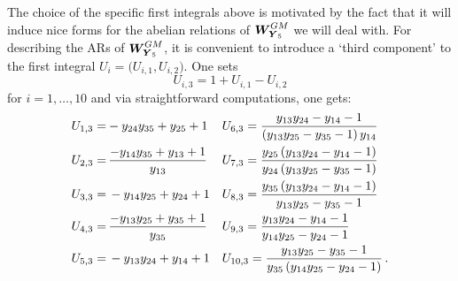 \documentclass[11pt]{amsart}
\newcommand{\sk}{\smallskip}
\begin{document}


The choice of the specific first integrals above is motivated by the fact that it will induce nice forms for the abelian relations of $\boldsymbol{W}^{GM}_{\hspace{-0.05cm}\boldsymbol{Y}_5}$ we will deal with. For describing the ARs of $\boldsymbol{W}^{GM}_{\hspace{-0.05cm}\boldsymbol{Y}_5}$, it is convenient to introduce a `third component' to the first integral $U_i=\big(U_{i,1} , U_{i,2}\big)$. One sets 
\begin{equation}
U_{i,3}=1+U_{i,1}
-U_{i,2} 
\end{equation}
for $i=1,\ldots,10$ and via straightforward computations, one gets: %
\begin{align}
\label{Eq:Formules-Ui3}
 U_{1,3}
=&
- {y_{24}}  {y_{35}} + {y_{25}} +1
&& 
 U_{6,3}=
\frac{ {y_{13}}  {y_{24}} - {y_{14}} -1}{\left( {y_{13}}  {y_{25}} - {y_{35}} -1\right)  {y_{14}}}
\nonumber
\\ \sk 
 U_{2,3}
=&\,
\frac{- {y_{14}}  {y_{35}} + {y_{13}} +1}{ {y_{13}}}
&& 
 U_{7,3}
= \frac{ {y_{25}} \left( {y_{13}}  {y_{24}} - {y_{14}} -1\right)}{  {y_{24}}\left( {y_{13}}  {y_{25}} - {y_{35}} -1\right)}
\nonumber
\\ \sk 
U_{3,3}
=&\,
- {y_{14}}  {y_{25}} + {y_{24}} +1
&&
U_{8,3}
=
\frac{ {y_{35}} \left( {y_{13}}  {y_{24}} - {y_{14}} -1\right)}{ {y_{13}}  {y_{25}} - {y_{35}} -1}
\\ \sk 
U_{4,3}
=&\,
\frac{- {y_{13}}  {y_{25}} + {y_{35}} +1}{ {y_{35}}}
&&
U_{9,3}
=
\frac{ {y_{13}}  {y_{24}} - {y_{14}} -1}{ {y_{14}}  {y_{25}} - {y_{24}} -1}
\nonumber
\\ \sk 
U_{5,3}
=&\, 
- {y_{13}}  {y_{24}} + {y_{14}} +1
&&
 U_{10,3}
=
\frac{ {y_{13}}  {y_{25}} - {y_{35}} -1}{ {y_{35}}\left( {y_{14}}  {y_{25}} - {y_{24}} -1\right) }
\, .
\nonumber
\end{align}
\end{document}
